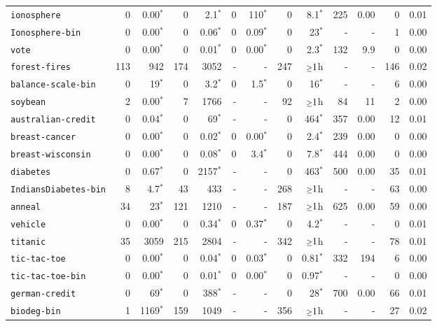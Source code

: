 \begin{tabular}{lrrrrrrrrrrrr}
\texttt{ionosphere} & 0 & 0.00$^*$ & 0 & 2.1$^*$ & 0 & 110$^*$ & 0 & 8.1$^*$ & 225 & 0.00 & 0 & 0.01\\
\texttt{Ionosphere-bin} & 0 & 0.00$^*$ & 0 & 0.06$^*$ & 0 & 0.09$^*$ & 0 & 23$^*$ & - & - & 1 & 0.00\\
\texttt{vote} & 0 & 0.00$^*$ & 0 & 0.01$^*$ & 0 & 0.00$^*$ & 0 & 2.3$^*$ & 132 & 9.9 & 0 & 0.00\\
\texttt{forest-fires} & 113 & 942 & 174 & 3052 & - & - & 247 & $\mathsmaller{\geq}1$h & - & - & 146 & 0.02\\
\texttt{balance-scale-bin} & 0 & 19$^*$ & 0 & 3.2$^*$ & 0 & 1.5$^*$ & 0 & 16$^*$ & - & - & 6 & 0.00\\
\texttt{soybean} & 2 & 0.00$^*$ & 7 & 1766 & - & - & 92 & $\mathsmaller{\geq}1$h & 84 & 11 & 2 & 0.00\\
\texttt{australian-credit} & 0 & 0.04$^*$ & 0 & 69$^*$ & - & - & 0 & 464$^*$ & 357 & 0.00 & 12 & 0.01\\
\texttt{breast-cancer} & 0 & 0.00$^*$ & 0 & 0.02$^*$ & 0 & 0.00$^*$ & 0 & 2.4$^*$ & 239 & 0.00 & 0 & 0.00\\
\texttt{breast-wisconsin} & 0 & 0.00$^*$ & 0 & 0.08$^*$ & 0 & 3.4$^*$ & 0 & 7.8$^*$ & 444 & 0.00 & 0 & 0.00\\
\texttt{diabetes} & 0 & 0.67$^*$ & 0 & 2157$^*$ & - & - & 0 & 463$^*$ & 500 & 0.00 & 35 & 0.01\\
\texttt{IndiansDiabetes-bin} & 8 & 4.7$^*$ & 43 & 433 & - & - & 268 & $\mathsmaller{\geq}1$h & - & - & 63 & 0.00\\
\texttt{anneal} & 34 & 23$^*$ & 121 & 1210 & - & - & 187 & $\mathsmaller{\geq}1$h & 625 & 0.00 & 59 & 0.00\\
\texttt{vehicle} & 0 & 0.00$^*$ & 0 & 0.34$^*$ & 0 & 0.37$^*$ & 0 & 4.2$^*$ & - & - & 0 & 0.01\\
\texttt{titanic} & 35 & 3059 & 215 & 2804 & - & - & 342 & $\mathsmaller{\geq}1$h & - & - & 78 & 0.01\\
\texttt{tic-tac-toe} & 0 & 0.00$^*$ & 0 & 0.04$^*$ & 0 & 0.03$^*$ & 0 & 0.81$^*$ & 332 & 194 & 6 & 0.00\\
\texttt{tic-tac-toe-bin} & 0 & 0.00$^*$ & 0 & 0.01$^*$ & 0 & 0.00$^*$ & 0 & 0.97$^*$ & - & - & 0 & 0.00\\
\texttt{german-credit} & 0 & 69$^*$ & 0 & 388$^*$ & - & - & 0 & 28$^*$ & 700 & 0.00 & 66 & 0.01\\
\texttt{biodeg-bin} & 1 & 1169$^*$ & 159 & 1049 & - & - & 356 & $\mathsmaller{\geq}1$h & - & - & 27 & 0.02\\

\end{tabular}
